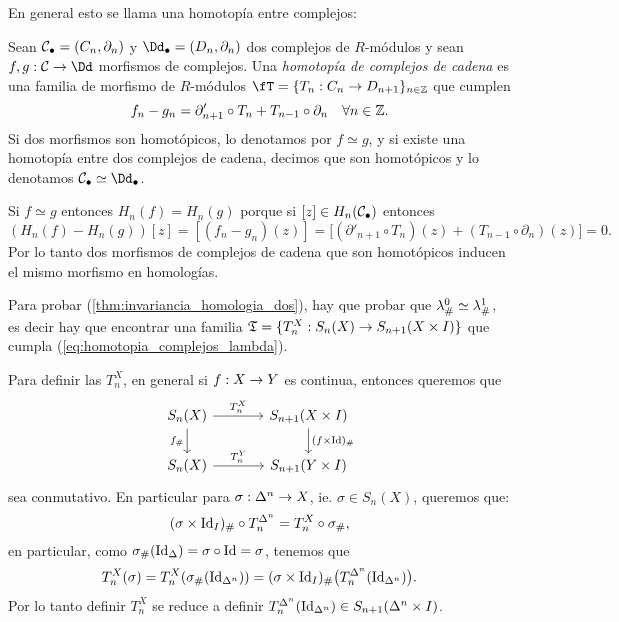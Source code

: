 \documentclass[../../topologia_algebraica]{subfiles}
\begin{document}
En general esto se llama una homotop\'ia entre complejos:

\begin{defin}
  Sean $\mathcal{C}_{\bullet}=(C_n,\partial_n)$ y $\Dd_{\bullet}=(D_n,\partial_n)$ dos complejos
  de $R$-m\'odulos y sean $f,g:\Cc\ra\Dd$ morfismos de complejos. Una \emph{homotop\'ia
    de complejos de cadena} es una familia de morfismo de $R$-m\'odulos
  $\fT=\{T_n:C_n\ra D_{n+1}\}_{n\in\ZZ}$ que cumplen
  \[
    f_n-g_n=\partial'_{n+1}\circ T_n + T_{n-1}\circ\partial_n\quad\forall n\in\mathbb{Z}.
  \]
  Si dos morfismos son homot\'opicos, lo denotamos por $f\simeq g$, y si existe una
  homotop\'ia entre dos complejos de cadena, decimos que son homot\'opicos y lo denotamos
  $\Cc_{\bullet}\simeq\Dd_{\bullet}$.
\end{defin}

\begin{nota}
  Si $f\simeq g$ entonces $H_n(f)=H_n(g)$ porque si $[z]\in H_n(\mathcal{C}_{\bullet})$ entonces
  \[
    (H_n(f)-H_n(g))[z]=[(f_n-g_n)(z)]=
    \big[(\partial'_{n+1}\circ T_n)(z) + (T_{n-1}\circ\partial_n)(z)\big]=0.
  \]
  Por lo tanto dos morfismos de complejos de cadena que son homot\'opicos inducen el
  mismo morfismo en homolog\'ias.

  Para probar (\ref{thm:invariancia_homologia_dos}), hay que probar que
  $\lambda_{\#}^0\simeq\lambda_{\#}^1$, es decir hay que encontrar una familia
  $\mathfrak{T}=\{T^X_n:S_n(X)\rightarrow S_{n+1}(X\times I)\}$ que cumpla (\ref{eq:homotopia_complejos_lambda}).
\end{nota}

Para definir las $T^X_n$, en general si $f:X\rightarrow Y$ es continua, entonces queremos que
\[
  \begin{tikzcd}[column sep=large]
    S_n(X) \arrow[r,"T^X_n"] \arrow[d,"f_{\#}"'] & S_{n+1}(X\times I) \arrow[d,"(f\times\Id)_{\#}"]\\
    S_n(X) \arrow[r,"T^Y_n"] & S_{n+1}(Y\times I)
  \end{tikzcd}
\]
sea conmutativo. En particular para $\sigma:\Delta^n\rightarrow X$, ie. $\sigma\in S_n(X)$, queremos
que:
\[
 (\sigma\times\text{Id}_I)_{\#}\circ T_n^{\Delta^n}=T^X_n\circ\sigma_{\#},
\]
en particular, como $\sigma_{\#}(\text{Id}_{\Delta})=\sigma\circ\text{Id}=\sigma$, tenemos que
\begin{equation}\label{eq:def_de_T}
  T^X_n(\sigma)=T^X_n(\sigma_{\#}(\text{Id}_{\Delta^n}))=
  (\sigma\times\text{Id}_I)_{\#} \big( T^{\Delta^n}_n(\text{Id}_{\Delta^n})\big).
\end{equation}
Por lo tanto definir $T^X_n$ se reduce a definir
$T_n^{\Delta^n}(\text{Id}_{\Delta^n})\in S_{n+1}(\Delta^n\times I)$.
\end{document}
